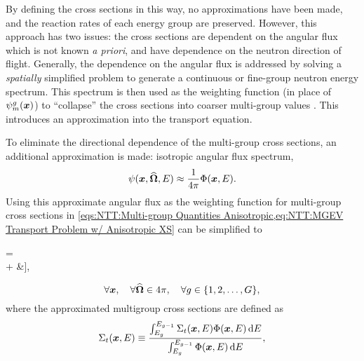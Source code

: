 {{{{                By defining the cross sections in this way, no approximations have been made, and the reaction rates of each energy group are preserved.
                However, this approach has two issues: the cross sections are dependent on the angular flux which is not known \textit{a priori}, and have dependence on the neutron direction of flight.
                Generally, the dependence on the angular flux is addressed by solving a \emph{spatially} simplified problem to generate a continuous or fine-group neutron energy spectrum.
                This spectrum is then used as the weighting function (in place of $\aflux$) to ``collapse'' the cross sections into coarser multi-group values \cite{Knott2010}.
                This introduces an approximation into the transport equation.

                To eliminate the directional dependence of the multi-group cross sections, an additional approximation is made: isotropic angular flux spectrum,
                \begin{equation}\label{eq:NTT:Multi-group Isotropic Spectrum}
                    \psi(\boldsymbol{x},\boldsymbol{\widehat{\Omega}},E) \approx \frac{1}{4\pi}\Phi(\boldsymbol{x}, E).
                \end{equation}
                Using this approximate angular flux as the weighting function for multi-group cross sections in \cref{eqs:NTT:Multi-group Quantities Anisotropic,eq:NTT:MGEV Transport Problem w/ Anisotropic XS} can be simplified to
                \begin{aequation}\label{eq:NTT:MGEV Transport Problem}
                    \left[\dir\vdot\grad + \xst\right]\aflux = \rfourpi\Bigg[&\suml[\gprime=1][G]\intl[\fourpi]\xss\aflux[\loc][\dirprime][\gprime]\ddirprime\\
                        + \frac{\spect}{\keff}&\suml[\gprime=1][G]\nufis\intl[\fourpi]\aflux[\loc][\dirprime][\gprime]\ddirprime\Bigg],
                \end{aequation}
                \begin{equation*}
                    \forall\boldsymbol{x}, \quad \forall\boldsymbol{\widehat{\Omega}}\in4\pi,\quad \forall g\in\{1,2,\ldots,G\},
                \end{equation*}
                where the approximated multigroup cross sections are defined as
                \begin{subequations}\label{eqs:NTT:Multi-group Cross Sections}
                    \begin{equation}\label{eq:NTT:Multi-group Total Cross Section}
                        \xst \defined \frac{\intl[E_{g}][E_{g-1}]\CrossSection_{t}(\loc,E)\FluxSpectrum(\loc,E)\dif{E}}{\intl[E_{g}][E_{g-1}]\FluxSpectrum(\loc,E)\dif{E}},

\end{equation}
\end{subequations}}}}}
